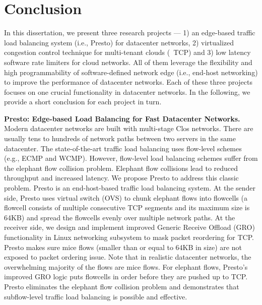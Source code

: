 
\section{Conclusion}

In this dissertation, we present three research projects --- 1) an edge-based traffic 
load balancing system (i.e., Presto) for datacenter networks, 2) virtualized congestion 
control technique for multi-tenant clouds (~\acdc TCP) and 3) low latency software rate 
limiters for cloud networks. All of them leverage the flexibility and high 
programmability of software-defined network edge (i.e., end-host networking) to improve 
the performance of datacenter networks. Each of these three projects focuses on one 
crucial functionality in datacenter networks. In the following, we provide a short 
conclusion for each project in turn.


{\bf Presto: Edge-based Load Balancing for Fast Datacenter Networks.} 
Modern datacenter networks are built with multi-stage Clos networks. There are 
usually tens to hundreds of network paths between two servers in the same datacenter.
The state-of-the-art traffic load balancing uses flow-level schemes (e.g., ECMP and WCMP). 
However, flow-level load balancing schemes suffer from the elephant flow collision problem. 
Elephant flow collisions lead to reduced throughput and increased latency. 
We propose Presto to address this classic problem. Presto is an end-host-based traffic 
load balancing system. At the sender side, Presto uses virtual switch (OVS) to 
chunk elephant flows into flowcells (a flowcell consists of multiple consecutive 
TCP segments and its maximum size is 64KB) and spread the flowcells evenly over 
multiple network paths. At the receiver side, we design and implement improved Generic 
Receive Offload (GRO) functionality in Linux networking subsystem to mask packet reordering for TCP. 
Presto makes sure mice flows (smaller than or equal to 64KB in size) are not exposed to packet 
ordering issue. Note that in realistic datacenter networks, the overwhelming majority of the 
flows are mice flows. For elephant flows, Presto's improved GRO logic puts flowcells in 
order before they are pushed up to TCP. Presto eliminates the elephant flow collision 
problem and demonstrates that subflow-level traffic load balancing is possible and effective. 


